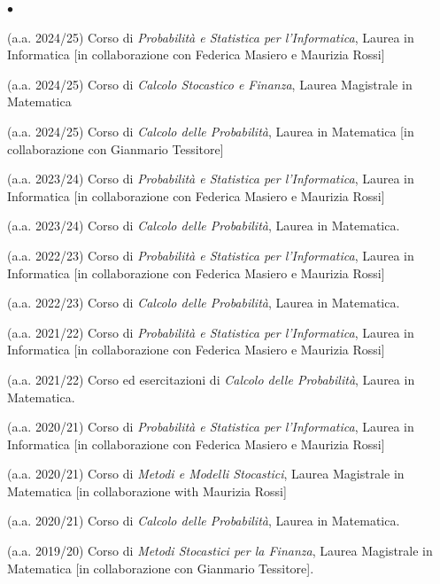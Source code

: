 \documentclass[a4paper,11pt,oneside]{amsart}
\newenvironment{myitemize}{%
\begin{list}{$\bullet$}%
 	{%
	\setlength{\itemsep}{0.3em}%
	\setlength{\topsep}{0.3em}%
	\setlength{\partopsep}{0em}%
	\setlength{\parsep}{0em}%
	\setlength{\parskip}{0em}%
	\setlength\leftmargin{1.5em}%
	\setlength\labelwidth{1.1em}%
	\setlength{\labelsep}{0.4em}%
	}%
	}%
{\end{list}}
\renewenvironment{itemize}{
\begin{myitemize}}%
{\end{myitemize}}
\begin{document}
\begin{itemize}
\item (a.a. 2024/25)
Corso di \textit{Probabilità e Statistica per l'Informatica},
Laurea in Informatica
[in collaborazione con Federica Masiero e Maurizia Rossi]

\item (a.a. 2024/25)
Corso di \textit{Calcolo Stocastico e Finanza},
Laurea Magistrale in Matematica

\item (a.a. 2024/25)
Corso di \textit{Calcolo delle Probabilità},
Laurea in Matematica
[in collaborazione con Gianmario Tessitore]

\item (a.a. 2023/24)
Corso di \textit{Probabilità e Statistica per l'Informatica},
Laurea in Informatica
[in collaborazione con Federica Masiero e Maurizia Rossi]

\item (a.a. 2023/24)
Corso di \textit{Calcolo delle Probabilità},
Laurea in Matematica.

\item (a.a. 2022/23)
Corso di \textit{Probabilità e Statistica per l'Informatica},
Laurea in Informatica
[in collaborazione con Federica Masiero e Maurizia Rossi]

\item (a.a. 2022/23)
Corso di \textit{Calcolo delle Probabilità},
Laurea in Matematica.

\item (a.a. 2021/22)
Corso di \textit{Probabilità e Statistica per l'Informatica},
Laurea in Informatica
[in collaborazione con Federica Masiero e Maurizia Rossi]

\item (a.a. 2021/22)
Corso ed esercitazioni di \textit{Calcolo delle Probabilità},
Laurea in Matematica.

\item (a.a. 2020/21)
Corso di \textit{Probabilità e Statistica per l'Informatica},
Laurea in Informatica
[in collaborazione con Federica Masiero e Maurizia Rossi]

\item (a.a. 2020/21)
Corso di \textit{Metodi e Modelli Stocastici},
Laurea Magistrale in Matematica
[in collaborazione with Maurizia Rossi]

\item (a.a. 2020/21)
Corso di \textit{Calcolo delle Probabilità},
Laurea in Matematica.

\item (a.a. 2019/20)
Corso di \textit{Metodi Stocastici per la Finanza},
Laurea Magistrale in Matematica
[in collaborazione con Gianmario Tessitore].


\end{itemize}
\end{document}
